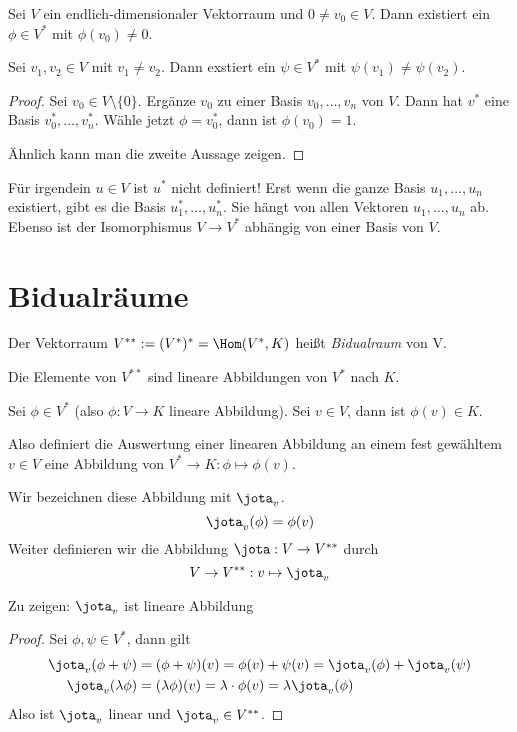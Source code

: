 \documentclass[a4paper, 10pt]{scrbook}
\begin{document}
\begin{kor} \label{kor: 9.3}
Sei $V$ ein endlich-dimensionaler Vektorraum und $0\neq v_0\in V$.
Dann existiert ein $\phi\in V^*$ mit $\phi(v_0)\neq 0$.

Sei $v_1,v_2\in V$ mit $v_1\neq v_2$. 
Dann exstiert ein $\psi\in V^*$ mit $\psi(v_1)\neq \psi(v_2)$.
\begin{proof}
Sei $v_0\in V \setminus \{0\}$.
Ergänze $v_0$ zu einer Basis $v_0,\dotsc,v_n$ von $V$.
Dann hat $v^*$ eine Basis $v_{0}^*,\dotsc,v_{n}^*$.
Wähle jetzt $\phi=v_0^*$, dann ist $\phi(v_0)=1$.

Ähnlich kann man die zweite Aussage zeigen.
\end{proof}
\end{kor}
\begin{note}
Für irgendein $u\in V$ ist $u^*$ nicht definiert!
Erst wenn die ganze Basis $u_1,\dotsc,u_n$ existiert, gibt es die Basis $u_1^*,\dotsc,u_n^*$.
Sie hängt von allen Vektoren $u_1,\dotsc,u_n$ ab.
Ebenso ist der Isomorphismus $V\to V^*$ abhängig von einer Basis von $V$.
\end{note}

\section{Bidualräume}

\begin{df} \label{df:9.4}
	Der Vektorraum $V^{**} := (V^*)^* = \Hom(V^*,K)$ heißt \emph{Bidualraum} von V.
\end{df}

Die Elemente von $V^{**}$ sind lineare Abbildungen von $V^*$ nach $K$.

Sei $\phi\in V^*$ (also $\phi: V\to K$ lineare Abbildung).
Sei $v\in V$, dann ist $\phi(v)\in K$.

Also definiert die Auswertung einer linearen Abbildung an einem fest gewähltem $v\in V$ eine Abbildung von $V^*\to K: \phi \mapsto \phi(v)$.

Wir bezeichnen diese Abbildung mit $\jota_v$.
\[
	\jota_v(\phi)=\phi(v)
\]
Weiter definieren wir die Abbildung $\jota: V\to V^{**}$ durch
\[
	V\to V^{**}:v\mapsto \jota_v
\]

Zu zeigen: $\jota_v$ ist lineare Abbildung
\begin{proof}
	Sei $\phi,\psi\in V^*$, dann gilt
\begin{align*}
\jota_v(\phi+\psi) &=(\phi+\psi)(v)=\phi(v)+\psi(v)=\jota_v(\phi)+\jota_v(\psi)\\
\jota_v(\lambda\phi) &=(\lambda\phi)(v)=\lambda\cdot\phi(v)=\lambda\jota_v(\phi)
\end{align*}
Also ist $\jota_v$ linear und $\jota_v\in V^{**}$.
\end{proof}
\end{document}
